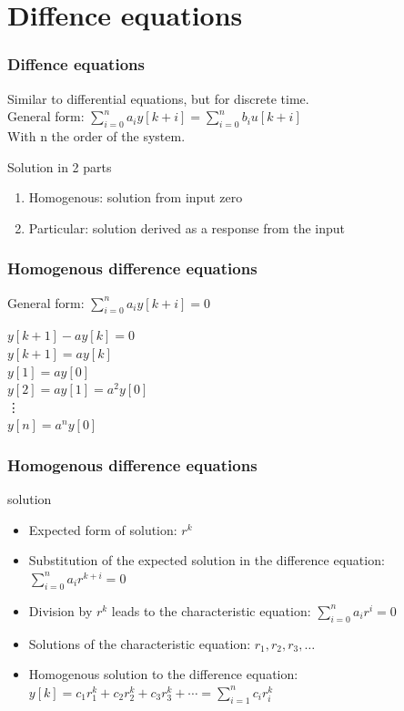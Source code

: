 \section{Diffence equations}
\begin{frame}
	\frametitle{Diffence equations}
	\begin{definition}
		Similar to differential equations, but for discrete time.\\
		General form: $\sum\limits_{i=0}^n a_iy[k+i] = \sum\limits_{i=0}^n b_iu[k+i]$\\
		With n  the order of the system.\\
	\end{definition}
	\begin{block}{Solution in 2 parts}
	\begin{enumerate}
			\item Homogenous: solution from input zero
			\item Particular: solution derived as a response from the input
	\end{enumerate}
	\end{block}
\end{frame}
\begin{frame}
	\frametitle{Homogenous difference equations}
	\begin{definition}
		General form: $\sum\limits_{i=0}^n a_iy[k+i]= 0$ \\
	\end{definition}
	\begin{example}
		$y[k+1] - ay[k] = 0$\\
		$y[k+1] = ay[k] $\\
		$y[1] = ay[0] $\\
		$y[2] = ay[1] = a^2y[0]$\\
		\hspace{1em}\vdots \\
		$y[n] = a^{n}y[0]$
	\end{example}

\end{frame}
\begin{frame}
	\frametitle{Homogenous difference equations}
	\begin{block}{solution}
		\begin{itemize}
			\item Expected form of solution: $r^{k}$ 
			\item 	Substitution of the expected solution in the difference equation:
			$\sum\limits_{i=0}^n a_ir^{k+i}= 0$
			\item Division by $r^{k}$ leads to the characteristic equation:
			$\sum\limits_{i=0}^n a_ir^{i}= 0$
			\item 	Solutions of the characteristic equation:
			$r_1,r_2,r_3,\dots$
			\item Homogenous solution to the difference equation: 
			$y[k] = c_1r_1^{k} + c_2r_2^{k} + c_3r_3^{k} + \cdots =\sum\limits_{i=1}^{n}c_ir_i^{k}$
		\end{itemize}
	\end{block}
\end{frame}
